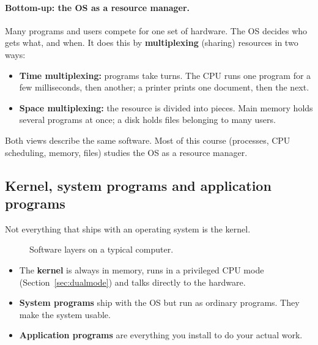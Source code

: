 \documentclass[11pt,a4paper]{article}
\newcommand{\term}[1]{\textbf{\color{mintdeep}#1}}
\begin{document}
\paragraph{Bottom-up: the OS as a resource manager.} Many programs and users compete for one set of hardware. The OS decides who gets what, and when. It does this by \term{multiplexing} (sharing) resources in two ways:
\begin{itemize}
  \item \textbf{Time multiplexing:} programs take turns. The CPU runs one program for a few milliseconds, then another; a printer prints one document, then the next.
  \item \textbf{Space multiplexing:} the resource is divided into pieces. Main memory holds several programs at once; a disk holds files belonging to many users.
\end{itemize}

Both views describe the same software. Most of this course (processes, CPU scheduling, memory, files) studies the OS as a resource manager.

\subsection{Kernel, system programs and application programs}

Not everything that ships with an operating system is the kernel.

\begin{figure}[H]
\centering
{}
\caption{Software layers on a typical computer.}
\end{figure}

\begin{itemize}
  \item The \textbf{kernel} is always in memory, runs in a privileged CPU mode (Section~\ref{sec:dualmode}) and talks directly to the hardware.
  \item \textbf{System programs} ship with the OS but run as ordinary programs. They make the system usable.
  \item \textbf{Application programs} are everything you install to do your actual work.
\end{itemize}
\end{document}
